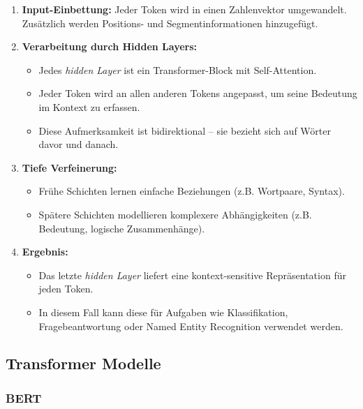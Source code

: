\begin{enumerate}
    \item \textbf{Input-Einbettung:} Jeder Token wird in einen Zahlenvektor umgewandelt. 
    Zusätzlich werden Positions- und Segmentinformationen hinzugefügt.
    
    \item \textbf{Verarbeitung durch Hidden Layers:} 
    \begin{itemize}
        \item Jedes \textit{hidden Layer} ist ein Transformer-Block mit Self-Attention.
        \item Jeder Token wird an allen anderen Tokens angepasst, um seine Bedeutung im Kontext zu erfassen.
        \item Diese Aufmerksamkeit ist bidirektional – sie bezieht sich auf Wörter davor und danach.
    \end{itemize}
    
    \item \textbf{Tiefe Verfeinerung:} 
    \begin{itemize}
        \item Frühe Schichten lernen einfache Beziehungen (z.B. Wortpaare, Syntax).
        \item Spätere Schichten modellieren komplexere Abhängigkeiten (z.B. Bedeutung, logische Zusammenhänge).
    \end{itemize}
    
    \item \textbf{Ergebnis:} 
    \begin{itemize}
        \item Das letzte \textit{hidden Layer} liefert eine kontext-sensitive Repräsentation für jeden Token.
        \item In diesem Fall kann diese für Aufgaben wie Klassifikation, Fragebeantwortung oder Named Entity Recognition verwendet werden.
    \end{itemize}
\end{enumerate} %


\subsection{Transformer Modelle}
\label{sec:transformer_modelle}

\subsubsection{BERT} \label{sec04:bert}

